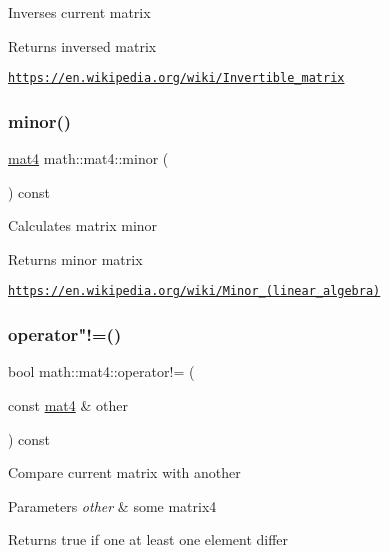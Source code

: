 Inverses current matrix \begin{DoxyReturn}{Returns}
inversed matrix
\end{DoxyReturn}
\href{https://en.wikipedia.org/wiki/Invertible_matrix}{\tt https\+://en.\+wikipedia.\+org/wiki/\+Invertible\+\_\+matrix} \mbox{\label{structmath_1_1mat4_a6e50d9526b70bdb83ca5c0d4e163db87}} 
\subsubsection{\texorpdfstring{minor()}{minor()}}
{\footnotesize\ttfamily \hyperlink{structmath_1_1mat4}{mat4} math\+::mat4\+::minor (\begin{DoxyParamCaption}{ }\end{DoxyParamCaption}) const\hspace{0.3cm}{\ttfamily [inline]}}

Calculates matrix minor \begin{DoxyReturn}{Returns}
minor matrix
\end{DoxyReturn}
\href{https://en.wikipedia.org/wiki/Minor_(linear_algebra)}{\tt https\+://en.\+wikipedia.\+org/wiki/\+Minor\+\_\+(linear\+\_\+algebra)} \mbox{\label{structmath_1_1mat4_a71a4c93eb519ac123b7347588a1c5377}} 
\subsubsection{\texorpdfstring{operator"!=()}{operator!=()}}
{\footnotesize\ttfamily bool math\+::mat4\+::operator!= (\begin{DoxyParamCaption}\item[{const \hyperlink{structmath_1_1mat4}{mat4} \&}]{other }\end{DoxyParamCaption}) const\hspace{0.3cm}{\ttfamily [inline]}}

Compare current matrix with another 
\begin{DoxyParams}{Parameters}
{\em other} & some matrix4 \\
\hline
\end{DoxyParams}
\begin{DoxyReturn}{Returns}
true if one at least one element differ 
\end{DoxyReturn}
\mbox{\label{structmath_1_1mat4_a62ba6a0b72f251fbbdb6b4d1941660bb}} 
